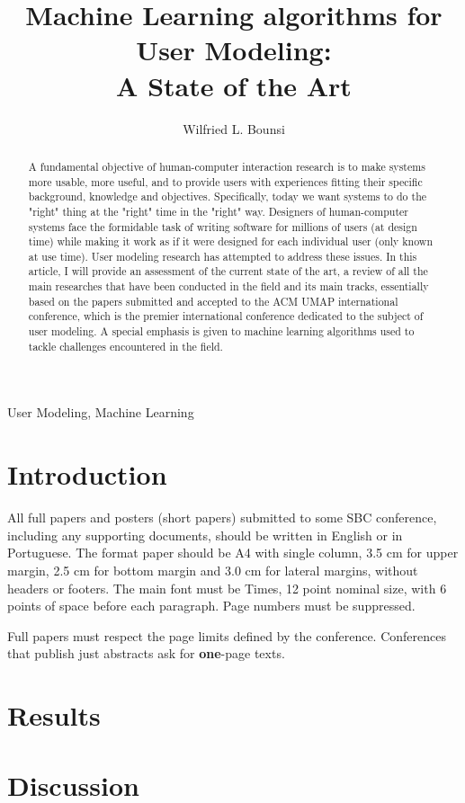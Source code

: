 \documentclass[12pt]{article}
\title{Machine Learning algorithms for User Modeling:\\ A State of the Art}
\author{Wilfried L. Bounsi\inst{1}}
\begin{document}
 

\maketitle

\begin{abstract}
  A fundamental objective of human-computer interaction research is to make systems more usable, more useful, and to provide users with experiences fitting their specific background, knowledge and objectives. Specifically, today we want systems to do the "right" thing at the "right" time in the "right" way. Designers of human-computer systems face the formidable task of writing software for millions of users (at design time) while making it work as if it were designed for each individual user (only known at use time). User modeling research has attempted to address these issues. In this article,
  I will provide an assessment of the current state of the art, a review of all the main researches that have been conducted in the field and its main tracks, essentially based on the papers submitted and accepted to the ACM UMAP international conference, which is the premier international conference dedicated to the subject of user modeling. A special emphasis is given to machine learning algorithms used to tackle challenges encountered in the field.
\end{abstract}
\begin{keywords}
User Modeling, Machine Learning
\end{keywords}

\section{Introduction}

All full papers and posters (short papers) submitted to some SBC conference,
including any supporting documents, should be written in English or in
Portuguese. The format paper should be A4 with single column, 3.5 cm for upper
margin, 2.5 cm for bottom margin and 3.0 cm for lateral margins, without
headers or footers. The main font must be Times, 12 point nominal size, with 6
points of space before each paragraph. Page numbers must be suppressed.

Full papers must respect the page limits defined by the conference.
Conferences that publish just abstracts ask for \textbf{one}-page texts.

\section{Results}
\section{Discussion}



\end{document}
